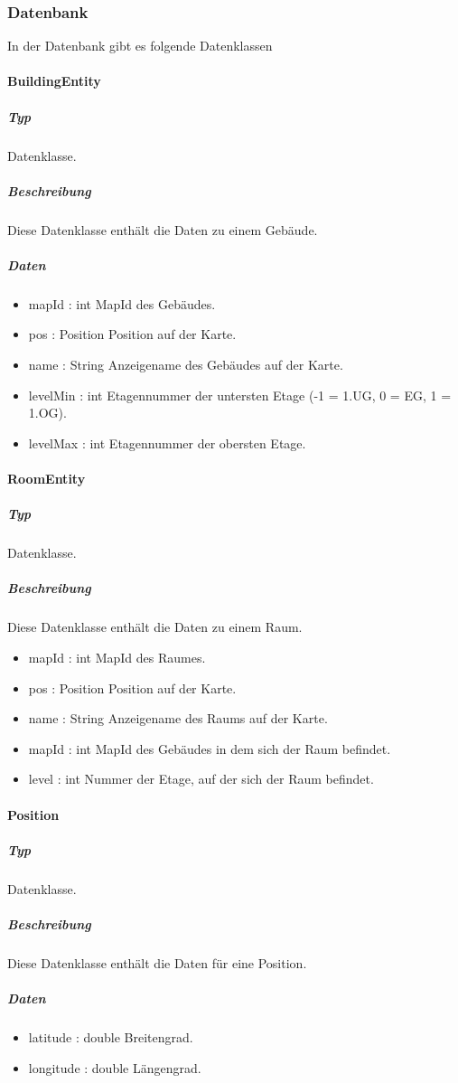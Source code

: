 \subsubsection{Datenbank}
In der Datenbank gibt es folgende Datenklassen

\paragraph{BuildingEntity}
\subparagraph*{Typ}
Datenklasse.
\subparagraph*{Beschreibung}
Diese Datenklasse enthält die Daten zu einem Gebäude.
\subparagraph*{Daten}
\begin{itemize}
    \item mapId : int MapId des Gebäudes.
    \item pos : Position Position auf der Karte.
    \item name : String Anzeigename des Gebäudes auf der Karte.
    \item levelMin : int Etagennummer der untersten Etage (-1 = 1.UG, 0 = EG, 1 = 1.OG).
    \item levelMax : int Etagennummer der obersten Etage.
\end{itemize}

\paragraph{RoomEntity}
\subparagraph*{Typ}
Datenklasse.
\subparagraph*{Beschreibung}
Diese Datenklasse enthält die Daten zu einem Raum.
\begin{itemize}
    \item mapId : int MapId des Raumes.
    \item pos : Position Position auf der Karte.
    \item name : String Anzeigename des Raums auf der Karte.
    \item mapId : int MapId des Gebäudes in dem sich der Raum befindet.
    \item level : int Nummer der Etage, auf der sich der Raum befindet.
\end{itemize}

\paragraph{Position}
\subparagraph*{Typ}
Datenklasse.
\subparagraph*{Beschreibung}
Diese Datenklasse enthält die Daten für eine Position.
\subparagraph*{Daten}
\begin{itemize}
    \item latitude : double Breitengrad.
    \item longitude : double Längengrad.
\end{itemize}
